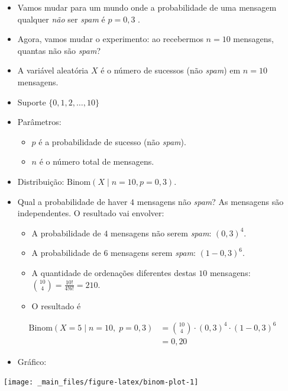 \documentclass[
  11pt]{report}
\providecommand{\tightlist}{%
  \setlength{\itemsep}{0pt}\setlength{\parskip}{0pt}}
\begin{document}
\begin{itemize}
\item
  Vamos mudar para um mundo onde a probabilidade de uma mensagem qualquer \emph{não} ser \emph{spam} é $p = 0{,}3$ .
\item
  Agora, vamos mudar o experimento: ao recebermos $n = 10$ mensagens, quantas não são \emph{spam}?
\item
  A variável aleatória $X$ é o número de sucessos (não \emph{spam}) em $n = 10$ mensagens.
\item
  Suporte $\{ 0, 1, 2, \ldots, 10 \}$
\item
  Parâmetros:

  \begin{itemize}
  \item
    $p$ é a probabilidade de sucesso (não \emph{spam}).
  \item
    $n$ é o número total de mensagens.
  \end{itemize}
\item
  Distribuição: $\text{Binom}(X \mid n = 10, p = 0{,}3)$.
\item
  Qual a probabilidade de haver $4$ mensagens não \emph{spam}? As mensagens são independentes. O resultado vai envolver:

  \begin{itemize}
  \item
    A probabilidade de $4$ mensagens não serem \emph{spam}: $(0{,}3)^4$.
  \item
    A probabilidade de $6$ mensagens serem \emph{spam}: $(1 - 0{,}3)^6$.
  \item
    A quantidade de ordenações diferentes destas $10$ mensagens: ${10 \choose 4} = \frac{10!}{4!6!} = 210$.
  \item
    O resultado é
  \end{itemize}
\end{itemize}

\[
\begin{aligned}
\text{Binom}(X = 5 \mid n = 10,\; p = 0{,}3) 
  &= {10 \choose 4} \cdot (0{,}3)^4 \cdot (1 - 0{,}3)^6 \\
  &= 0{,}20
\end{aligned}
\]

\begin{itemize}
\tightlist
\item
  Gráfico:
\end{itemize}

\begin{center}\texttt{[image: \_main\_files/figure-latex/binom-plot-1]} \end{center}
\end{document}
